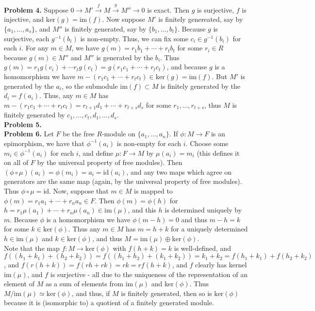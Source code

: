 \documentclass[11pt]{article}
\newcommand{\num}[1]{\noindent \textbf{#1}}
\theoremstyle{definition}
\begin{document}
\num{Problem 4.} Suppose $0\rightarrow
M'\stackrel{f}{\rightarrow}M\stackrel{g}{\rightarrow}M''\rightarrow0$
is exact. Then $g$ is surjective, $f$ is injective, and
$\text{ker}(g)=\text{im}(f)$. Now suppose $M'$ is finitely genereated,
say by $\{a_1,\ldots,a_s\}$, and $M''$ is finitely generated, say by
$\{b_1,\ldots,b_t\}$. Because $g$ is surjective, each $g^{-1}(b_i)$ is
non-empty. Thus, we can fix some $c_i\in g^{-1}(b_i)$ for each $i$. For any
$m\in M$, we have $g(m)=r_1b_1+\cdots+r_tb_t$ for some $r_i\in R$ because
$g(m)\in M''$ and $M''$ is generated by the $b_i$. Thus $g(m)=r_1g(c_i)+\cdots
r_tg(c_t)=g(r_1c_1+\cdots+r_tc_t)$, and because $g$ is a homomorphism
we have $m-(r_1c_1+\cdots+r_tc_t)\in\text{ker}(g)=\text{im}(f)$. But
$M'$ is generated by the $a_i$, so the submodule $\text{im}(f)\subset
M$ is finitely generated by the $d_i=f(a_i)$. Thus, any $m\in
M$ has $m-(r_1c_1+\cdots+r_tc_t)=r_{t+1}d_1+\cdots+r_{t+s}d_s$
for some $r_1,\ldots,r_{t+s}$, thus $M$ is finitely generated by
$c_1,\ldots,c_t,d_1,\ldots,d_s$.  \\

\num{Problem 5.}\\

\num{Problem 6.} Let $F$ be the free $R$-module on $\{a_1,\ldots,a_n\}$. If
$\phi:M\rightarrow F$ is an epimorphism, we have that $\phi^{-1}(a_i)$
is non-empty for each $i$. Choose some $m_i\in\phi^{-1}(a_i)$ for each
$i$, and define $\mu:F\rightarrow M$ by $\mu(a_i)=m_i$ (this defines
it on all of $F$ by the universal property of free modules). Then
$(\phi\circ\mu)(a_i)=\phi(m_i)=a_i=\text{id}(a_i)$, and any two maps which
agree on generators are the same map (again, by the universal property of
free modules). Thus $\phi\circ\mu=\text{id}$. Now, suppose that $m\in M$
is mapped to $\phi(m)=r_1a_1+\cdots+r_na_n\in F$. Then $\phi(m)=\phi(h)$
for $h=r_1\mu(a_1)+\cdots+r_n\mu(a_n)\in \text{im}(\mu)$, and this $h$
is determined uniquely by $m$. Because $\phi$ is a homomorphism we have
$\phi(m-h)=0$ and thus $m-h=k$ for some $k\in \text{ker}(\phi)$. Thus any
$m\in M$ has $m=h+k$ for a uniquely determined $h\in\text{im}(\mu)$ and
$k\in\text{ker}(\phi)$, and thus $M=\text{im}(\mu)\oplus\text{ker}(\phi)$.\\

\noindent Note that the map $f:M\rightarrow\text{ker}(\phi)$
with $f(h+k)=k$ is well-defined, and
$f((h_1+k_1)+(h_2+k_2))=f((h_1+h_2)+(k_1+k_2))=k_1+k_2=f(h_1+k_1)+f(h_2+k_2)$,
and  $f(r(h+k))=f(rh+rk)=rk=rf(h+k)$, and $f$ clearly has kernel
$\text{im}(\mu)$, and $f$ is surjective - all due to the uniqueness of the
representation of an element of $M$ as a sum of elements from im$(\mu)$
and ker$(\phi)$. Thus $M/\text{im}(\mu)\simeq \text{ker}(\phi)$, and thus,
if $M$ is finitely generated, then so is $\text{ker}(\phi)$ because it is
(isomorphic to) a quotient of a finitely generated module.\\
\end{document}

